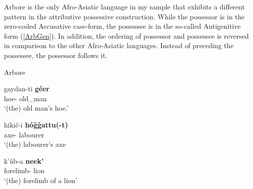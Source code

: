 {Arbore} is the only Afro-Asiatic language in my sample that exhibits a different pattern in the attributive possessive construction.
While the possessor is in the zero-coded Accusative case-form, the possessee is in the so-called Antigenitive form (\ref{ArbGen}).
In addition, the ordering of possessor and possessee is reversed in comparison to the other Afro-Asiatic languages. 
Instead of preceding the possessee, the possessor follows it.

 
\begin{exe}\ex\label{ArbGen} {Arbore} \citep[Eastern Cushitic; Ethiopia; ][151]{Hayward:1984}\nopagebreak[4]
\begin{xlist}
\ex\gll gaydan-ti \textbf{g\'eer}\\
 hoe-\antgen{} old\_man\\
 `(the) old man's hoe.'
 

\ex\gll hiki\v c-i \textbf{h\'o\v g\v gattu(-t)}\\
axe-\antgen{} labourer\\
`(the) labourer's axe

\ex\gll k'\'ub-a \textbf{neek'}\\
forelimb-\antgen{}  lion\\
`(the) forelimb of a lion'
\end{xlist}
\end{exe}




